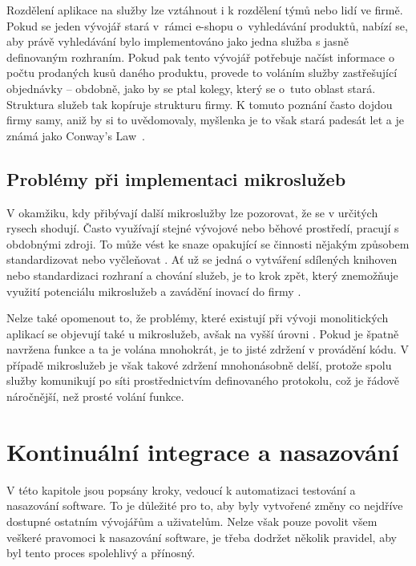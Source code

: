 \documentclass[FM,DP]{tulthesis}
\begin{document}
Rozdělení aplikace na služby lze vztáhnout i k rozdělení týmů nebo lidí ve firmě. Pokud se jeden vývojář stará v~rámci 
e-shopu o~vyhledávání produktů, nabízí se, aby právě vyhledávání bylo implementováno jako jedna služba s jasně 
definovaným rozhraním. Pokud pak tento vývojář potřebuje načíst informace o počtu prodaných kusů daného produktu, 
provede to voláním služby zastřešující objednávky -- obdobně, jako by se ptal kolegy, který se o~tuto oblast stará.
Struktura služeb tak kopíruje strukturu firmy. K tomuto poznání často dojdou firmy samy, aniž by si to uvědomovaly, 
myšlenka je to však stará padesát let a je známá jako Conway's Law~\cite{monolith}.

\subsection{Problémy při implementaci mikroslužeb}

V okamžiku, kdy přibývají další mikroslužby lze pozorovat, že se v určitých rysech shodují. Často využívají
stejné vývojové nebo běhové prostředí, pracují s obdobnými zdroji. To může vést ke snaze opakující se činnosti
nějakým způsobem standardizovat nebo vyčleňovat \cite[strana~24]{microservices}. Ať už se jedná o vytváření 
sdílených knihoven  nebo standardizaci rozhraní a chování služeb, je to krok zpět, který znemožňuje 
využití potenciálu mikroslužeb a zavádění inovací do firmy \cite[strana~27]{devops}.

Nelze také opomenout to, že problémy, které existují při vývoji monolitických aplikací se objevují také
u mikroslužeb, avšak na vyšší úrovni \cite{microservices-blog}. Pokud je špatně navržena funkce a ta je 
volána mnohokrát, je to jisté zdržení v provádění kódu. V případě mikroslužeb je však takové zdržení 
mnohonásobně delší, protože spolu služby komunikují po síti prostřednictvím definovaného protokolu, 
což je řádově náročnější, než prosté volání funkce.


\section{Kontinuální integrace a nasazování}
\label{section:ci}

V této kapitole jsou popsány kroky, vedoucí k automatizaci testování a nasazování software. To je důležité
pro to, aby byly vytvořené změny co nejdříve dostupné ostatním vývojářům a uživatelům. Nelze však pouze povolit
všem veškeré pravomoci k nasazování software, je třeba dodržet několik pravidel, aby byl tento proces spolehlivý
a přínosný.
\end{document}
